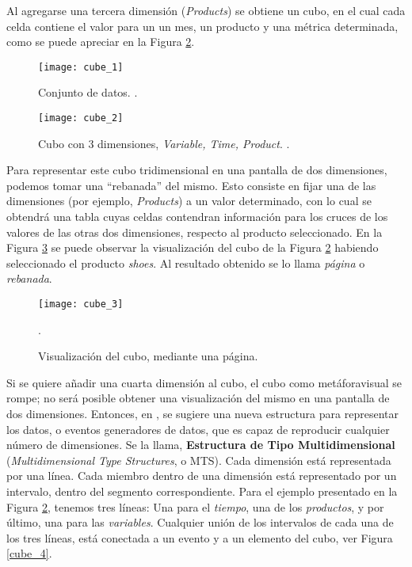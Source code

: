 \documentclass[a4paper,11pt]{article}
\begin{document}
    Al agregarse una tercera dimensión (\textit{Products}) se obtiene un cubo, en el cual cada celda contiene el valor para un un mes,
    un producto y una métrica determinada, como se puede apreciar en la Figura \ref{cube_2}.
    
    \begin{figure}
      \begin{center}
        \texttt{[image: cube\_1]}
        \caption{Conjunto de datos. \cite[p.~48]{olap_solutions}.}
        \label{tab_cube}
      \end{center}
    \end{figure}
    
    \begin{figure}
      \begin{center}
        \texttt{[image: cube\_2]}
        \caption{Cubo con 3 dimensiones, \textit{Variable, Time, Product}. \cite[p.~49]{olap_solutions}.}
        \label{cube_2}
      \end{center}
    \end{figure}
    
    
    Para representar este cubo tridimensional en una pantalla de dos dimensiones, podemos tomar una ``rebanada'' del mismo.
    Esto consiste en fijar una de las dimensiones (por ejemplo, \textit{Products}) a un valor determinado, con lo cual se obtendrá una
    tabla cuyas celdas contendran información para los cruces de los valores de las otras dos dimensiones, respecto al producto seleccionado. En la Figura
    \ref{cube_3} se puede observar la visualización del cubo de la Figura \ref{cube_2} habiendo seleccionado el producto \textit{shoes}. Al resultado obtenido se
    lo llama \textit{página} o \textit{rebanada}.
    
    \begin{figure}
      \begin{center}
        \texttt{[image: cube\_3]}
        \caption{Visualización del cubo, mediante una página.} \cite[p.~51]{olap_solutions}.
        \label{cube_3}
      \end{center}
    \end{figure}

    Si se quiere añadir una cuarta dimensión al cubo, el cubo como metáforavisual se rompe; no será posible obtener una visualización del mismo en una
    pantalla de dos dimensiones. Entonces, en \cite{olap_solutions}, se sugiere una nueva estructura para representar los datos, o eventos generadores de datos,
    que es capaz de reproducir cualquier número de dimensiones.
    Se la llama, \textbf{Estructura de Tipo Multidimensional} (\textit{Multidimensional Type Structures}, o MTS).
    Cada dimensión está representada por una línea. Cada miembro dentro de una dimensión está representado por un intervalo, dentro del segmento correspondiente.
    Para el ejemplo presentado en la Figura \ref{cube_2}, tenemos tres líneas:
    Una para el \textit{tiempo}, una de los \textit{productos}, y por último, una para las \textit{variables}.
    Cualquier unión de los intervalos de cada una de los tres líneas, está conectada a un evento y a un elemento del cubo, ver Figura \ref{cube_4}.
\end{document}
